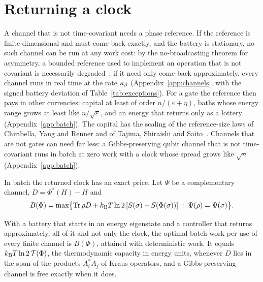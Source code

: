 \section{Returning a clock}\label{to:sec:clock}

A channel that is not time-covariant needs a phase reference. If the reference is finite-dimensional and must come back exactly, and the battery is stationary, no such channel can be run at any work cost: by the no-broadcasting theorem for asymmetry, a bounded reference used to implement an operation that is not covariant is necessarily degraded~\cite{MarvianSpekkens19,LostaglioMuller19}; if it need only come back approximately, every channel runs in real time at the rate $\kappa_\beta$ (Appendix~\ref{app:channels}, with the signed battery deviation of Table~\ref{tab:exceptions}). For a gate the reference then pays in other currencies: capital at least of order $n/(\varepsilon+\eta)$, baths whose energy range grows at least like $n/\sqrt\varepsilon$, and an energy that returns only as a lottery (Appendix~\ref{app:batch}). The capital has the scaling of the reference-size laws of Chiribella, Yang and Renner and of Tajima, Shiraishi and Saito~\cite{ChiribellaYangRenner21,TSS20}. Channels that are not gates can need far less: a Gibbs-preserving qubit channel that is not time-covariant runs in batch at zero work with a clock whose spread grows like $\sqrt n$ (Appendix~\ref{app:batch}).

In batch the returned clock has an exact price. Let $\Psi$ be a complementary channel, $D=\Phi^*(H)-H$ and
\[
B(\Phi)=\max\bigl\{\operatorname{Tr}\rho D+k_{\mathrm B} T\ln2\,[S(\sigma)-S(\Phi(\sigma))]\;:\;\Psi(\rho)=\Psi(\sigma)\bigr\}.
\]

\begin{theorem}\label{to:thm:batchlaw}
With a battery that starts in an energy eigenstate and a controller that returns approximately, all of it and not only the clock, the optimal batch work per use of every finite channel is $B(\Phi)$, attained with deterministic work. It equals $k_{\mathrm B} T\ln2\,\mathcal T(\Phi)$, the thermodynamic capacity in energy units, whenever $D$ lies in the span of the products $A_i^*A_j$ of Kraus operators, and a Gibbs-preserving channel is free exactly when it does.
\end{theorem}

